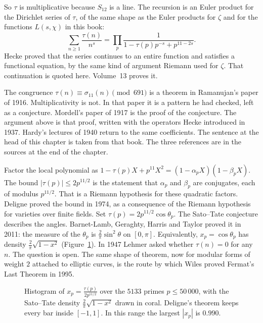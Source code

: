 So $\tau$ is multiplicative because $S_{12}$ is a line. The recursion is an Euler product for the Dirichlet series of $\tau$, of the same shape as the Euler products for $\zeta$ and for the functions $L(s,\chi)$ in this book:
\[
\sum_{n\ge1}\frac{\tau(n)}{n^s}=\prod_p\frac1{1-\tau(p)p^{-s}+p^{11-2s}}.
\]
Hecke proved that the series continues to an entire function and satisfies a functional equation, by the same kind of argument Riemann used for $\zeta$. That continuation is quoted here. Volume~13 proves it.

\begin{remark}
The congruence $\tau(n)\equiv\sigma_{11}(n)\pmod{691}$ is a theorem in Ramanujan's paper of 1916. Multiplicativity is not. In that paper it is a pattern he had checked, left as a conjecture. Mordell's paper of 1917 is the proof of the conjecture. The argument above is that proof, written with the operators Hecke introduced in 1937. Hardy’s lectures of 1940 return to the same coefficients. The sentence at the head of this chapter is taken from that book. The three references are in the sources at the end of the chapter.
\end{remark}

\begin{remark}
Factor the local polynomial as $1-\tau(p)X+p^{11}X^2=(1-\alpha_pX)(1-\beta_pX)$. The bound $|\tau(p)|\le2p^{11/2}$ is the statement that $\alpha_p$ and $\beta_p$ are conjugates, each of modulus $p^{11/2}$. That is a Riemann hypothesis for these quadratic factors. Deligne proved the bound in 1974, as a consequence of the Riemann hypothesis for varieties over finite fields. Set $\tau(p)=2p^{11/2}\cos\theta_p$. The Sato--Tate conjecture describes the angles. Barnet-Lamb, Geraghty, Harris and Taylor proved it in 2011: the measure of the $\theta_p$ is $\frac2\pi\sin^2\theta$ on $[0,\pi]$. Equivalently, $x_p=\cos\theta_p$ has density $\frac2\pi\sqrt{1-x^2}$ (Figure~\ref{fig:satotate}). In 1947 Lehmer asked whether $\tau(n)=0$ for any $n$. The question is open. The same shape of theorem, now for modular forms of weight $2$ attached to elliptic curves, is the route by which Wiles proved Fermat's Last Theorem in 1995.
\end{remark}

\begin{figure}[ht]
\centering
{}
\caption{Histogram of $x_p=\frac{\tau(p)}{2p^{11/2}}$ over the $5133$ primes $p\le50\,000$, with the Sato--Tate density $\frac2\pi\sqrt{1-x^2}$ drawn in coral. Deligne's theorem keeps every bar inside $[-1,1]$. In this range the largest $|x_p|$ is $0.990$.}
\label{fig:satotate}
\end{figure}

